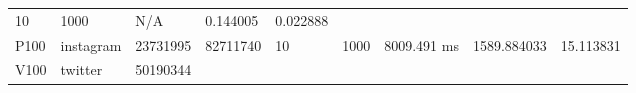\documentclass[10pt,oneside]{memoir}
\begin{document}
\begin{longtable}[]{@{}lllllllll@{}}
\begin{minipage}[t]{0.07\columnwidth}
10\strut
\end{minipage} & \begin{minipage}[t]{0.09\columnwidth}\raggedright
1000\strut
\end{minipage} & \begin{minipage}[t]{0.12\columnwidth}\raggedright
N/A\strut
\end{minipage} & \begin{minipage}[t]{0.10\columnwidth}\raggedright
0.144005\strut
\end{minipage} & \begin{minipage}[t]{0.09\columnwidth}\raggedright
0.022888\strut
\end{minipage}\tabularnewline
\begin{minipage}[t]{0.04\columnwidth}\raggedright
P100\strut
\end{minipage} & \begin{minipage}[t]{0.12\columnwidth}\raggedright
instagram\strut
\end{minipage} & \begin{minipage}[t]{0.06\columnwidth}\raggedright
23731995\strut
\end{minipage} & \begin{minipage}[t]{0.07\columnwidth}\raggedright
82711740\strut
\end{minipage} & \begin{minipage}[t]{0.07\columnwidth}\raggedright
10\strut
\end{minipage} & \begin{minipage}[t]{0.09\columnwidth}\raggedright
1000\strut
\end{minipage} & \begin{minipage}[t]{0.12\columnwidth}\raggedright
8009.491 ms\strut
\end{minipage} & \begin{minipage}[t]{0.10\columnwidth}\raggedright
1589.884033\strut
\end{minipage} & \begin{minipage}[t]{0.09\columnwidth}\raggedright
15.113831\strut
\end{minipage}\tabularnewline
\begin{minipage}[t]{0.04\columnwidth}\raggedright
V100\strut
\end{minipage} & \begin{minipage}[t]{0.12\columnwidth}\raggedright
twitter\strut
\end{minipage} & \begin{minipage}[t]{0.06\columnwidth}\raggedright
50190344\strut

\end{minipage}
\end{longtable}
\end{document}
